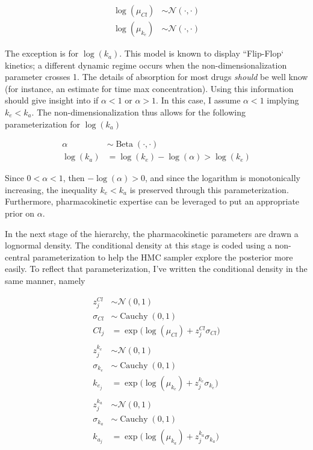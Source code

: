 \documentclass[12pt,a4paper]{book}
\begin{document}
\begin{align}
	\log(\mu_{Cl}) &\sim \mathcal{N}(\cdot, \cdot)\\
	\log(\mu_{k_e}) &\sim \mathcal{N}(\cdot, \cdot)
\end{align}

The exception is for $ \log(k_a) $.  This model is known to display ``Flip-Flop` kinetics; a different dynamic regime occurs when the non-dimensionalization parameter crosses 1.  The details of absorption for most drugs \textit{should} be well know (for instance, an estimate for time max concentration).  Using this information should give insight into if $ \alpha<1 $ or $ \alpha>1 $.  In this case, I assume $\alpha<1$ implying $ k_e<k_a $.  The non-dimensionalization thus allows for the following parameterization for $ \log(k_a) $

\begin{align}
\alpha &\sim \operatorname{Beta}(\cdot, \cdot)\\
\log(k_a) &= \log(k_e) - \log(\alpha) > \log(k_e)
\end{align}

\noindent Since $ 0<\alpha<1 $, then $ -\log(\alpha)>0 $, and since the logarithm is monotonically increasing, the inequality $ k_e < k_a $ is preserved through this parameterization.  Furthermore, pharmacokinetic expertise can be leveraged to put an appropriate prior on $ \alpha $.

In the next stage of the hierarchy, the pharmacokinetic parameters are drawn a lognormal density.  The conditional density at this stage is coded using a non-central parameterization to help the HMC sampler explore the posterior more easily.  To reflect that parameterization, I've written the conditional density in the same manner, namely  

\begin{align}
	z^{Cl}_j &\sim \mathcal{N}(0,1)\\
	\sigma_{Cl} &\sim \operatorname{Cauchy}(0,1)\\
	Cl_j &= \exp\Big(\log(\mu_{Cl}) + z^{Cl}_j\sigma_{Cl}\Big) \\ \nonumber\\
	z^{k_e}_j &\sim \mathcal{N}(0,1)\\
	\sigma_{k_e} &\sim \operatorname{Cauchy}(0,1)\\
	k_{e_j} &= \exp\Big(\log(\mu_{k_e}) + z^{k_e}_j\sigma_{k_e}\Big) \\ \nonumber \\
	z^{k_a}_j &\sim \mathcal{N}(0,1)\\
	\sigma_{k_a} &\sim \operatorname{Cauchy}(0,1)\\
	k_{a_j} &= \exp\Big(\log(\mu_{k_a}) + z^{k_a}_j\sigma_{k_a}\Big)
\end{align}
 
\end{document}
